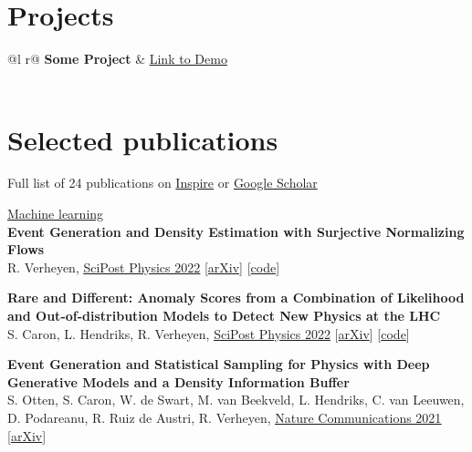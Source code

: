 \documentclass[a4paper,12pt]{article}
\begin{document}
\section{Projects}

\begin{tabularx}{\linewidth}{ @{}l r@{} }
\textbf{Some Project} & \hfill \href{https://some-link.com}{Link to Demo} \\[3.75pt]
  \\
\end{tabularx}


\section{Selected publications}
Full list of 24 publications on \href{https://inspirehep.net/authors/1777870?ui-citation-summary=true}{Inspire} or \href{https://scholar.google.com/citations?user=MRTAm7UAAAAJ&hl=en&oi=ao}{Google Scholar}

\underline{\large{Machine learning}} \\ [5pt]
\textbf{Event Generation and Density Estimation with Surjective Normalizing Flows} \\
R. Verheyen, 
\href{https://scipost.org/10.21468/SciPostPhys.13.3.047}{\underline{SciPost Physics 2022}} [\href{https://arxiv.org/abs/2205.01697}{arXiv}] [\href{https://github.com/rbvh/surflows}{code}]

\textbf{Rare and Different: Anomaly Scores from a Combination of Likelihood and Out-of-distribution Models to Detect New Physics at the LHC} \\
S. Caron, L. Hendriks, R. Verheyen,
\href{https://scipost.org/10.21468/SciPostPhys.12.1.043}{\underline{SciPost Physics 2022}} [\href{https://arxiv.org/pdf/2105.14027.pdf}{arXiv}] [\href{https://github.com/bostdiek/DarkMachines-UnsupervisedChallenge}{code}]

\textbf{Event Generation and Statistical Sampling for Physics with Deep Generative Models and a Density Information Buffer} \\
S. Otten, S. Caron, W. de Swart, M. van Beekveld, L. Hendriks, C. van Leeuwen, D. Podareanu, R. Ruiz de Austri, R. Verheyen, 
\href{https://www.nature.com/articles/s41467-021-22616-z}{\underline{Nature Communications 2021}} [\href{https://arxiv.org/abs/1901.00875}{arXiv}]
\end{document}
